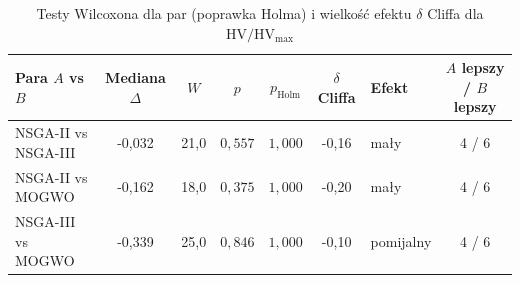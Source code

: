 \begin{table}[htbp]
    \centering
    \caption{Testy Wilcoxona dla par (poprawka Holma) i wielkość efektu $\delta$ Cliffa dla $\mathrm{HV}/\mathrm{HV}_{\max}$}
    \label{tab:pairwise}
    \begin{tabular}{l c c c c c l c}
        \hline
        Para $A$ vs $B$ & Mediana $\Delta$ & $W$ & $p$ & $p_{\text{Holm}}$ & $\delta$ Cliffa & Efekt & $A$ lepszy / $B$ lepszy \\
        \hline
        NSGA-II vs NSGA-III & -0{,}032 & 21{,}0 & $0{,}557$ & $1{,}000$ & -0{,}16 & mały & 4 / 6 \\
        NSGA-II vs MOGWO & -0{,}162 & 18{,}0 & $0{,}375$ & $1{,}000$ & -0{,}20 & mały & 4 / 6 \\
        NSGA-III vs MOGWO & -0{,}339 & 25{,}0 & $0{,}846$ & $1{,}000$ & -0{,}10 & pomijalny & 4 / 6 \\
        \hline
    \end{tabular}
\end{table}
